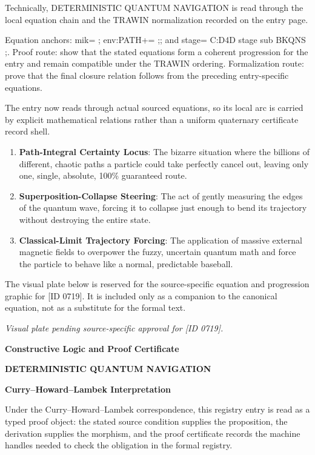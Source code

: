 Technically, DETERMINISTIC QUANTUM NAVIGATION is read through the local equation chain and the TRAWIN normalization recorded on the entry page.

Equation anchors: mik= ; env:PATH+= ;; and stage= C:D4D stage sub BKQNS ;. Proof route: show that the stated equations form a coherent progression for the entry and remain compatible under the TRAWIN ordering. Formalization route: prove that the final closure relation follows from the preceding entry-specific equations.

The entry now reads through actual sourced equations, so its local arc is carried by explicit mathematical relations rather than a uniform quaternary certificate record shell.
\endgroup

\begin{enumerate}[leftmargin=1.6em,itemsep=6pt,topsep=4pt]
\item \textbf{Path-Integral Certainty Locus}: The bizarre situation where the billions of different, chaotic paths a particle could take perfectly cancel out, leaving only one, single, absolute, 100\% guaranteed route.
\item \textbf{Superposition-Collapse Steering}: The act of gently measuring the edges of the quantum wave, forcing it to collapse just enough to bend its trajectory without destroying the entire state.
\item \textbf{Classical-Limit Trajectory Forcing}: The application of massive external magnetic fields to overpower the fuzzy, uncertain quantum math and force the particle to behave like a normal, predictable baseball.
\end{enumerate}

\begingroup\footnotesize\sloppy
The visual plate below is reserved for the source-specific equation and progression graphic for [ID 0719]. It is included only as a companion to the canonical equation, not as a substitute for the formal text.
\par\endgroup
\begingroup\footnotesize\itshape
Visual plate pending source-specific approval for [ID 0719].
\par\endgroup

\clearpage
\begingroup\tzpsupportsetup
\noindent\textbf{\fontsize{10.8pt}{12.8pt}\selectfont [ID 0719] Constructive Logic and Proof Certificate}\par
\noindent\textbf{\fontsize{10pt}{12pt}\selectfont DETERMINISTIC QUANTUM NAVIGATION}\par
\vspace{0.45em}
\begingroup
\footnotesize
\setlength{\parskip}{0.22em}
\setlength{\parindent}{0pt}
\noindent\textbf{Curry--Howard--Lambek Interpretation}\par
Under the Curry--Howard--Lambek correspondence, this registry entry is read as a typed proof
object: the stated source condition supplies the proposition, the derivation supplies the
morphism, and the proof certificate records the machine handles needed to check the obligation
in the formal registry.

